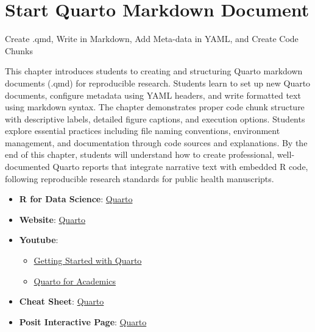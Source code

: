 \documentclass[
  english,
  letterpaper,
  DIV=11,
  numbers=noendperiod]{scrreprt}
\providecommand{\tightlist}{%
  \setlength{\itemsep}{0pt}\setlength{\parskip}{0pt}}
\begin{document}
\chapter{Start Quarto Markdown
Document}\label{start-quarto-markdown-document}

Create .qmd, Write in Markdown, Add Meta-data in YAML, and Create Code
Chunks

This chapter introduces students to creating and structuring Quarto
markdown documents (.qmd) for reproducible research. Students learn to
set up new Quarto documents, configure metadata using YAML headers, and
write formatted text using markdown syntax. The chapter demonstrates
proper code chunk structure with descriptive labels, detailed figure
captions, and execution options. Students explore essential practices
including file naming conventions, environment management, and
documentation through code sources and explanations. By the end of this
chapter, students will understand how to create professional,
well-documented Quarto reports that integrate narrative text with
embedded R code, following reproducible research standards for public
health manuscripts.

\hfill\break

\begin{tcolorbox}[enhanced jigsaw, title=\textcolor{quarto-callout-tip-color}{\faLightbulb}\hspace{0.5em}{📖 Learning Resources}, opacityback=0, colframe=quarto-callout-tip-color-frame, rightrule=.15mm, left=2mm, toprule=.15mm, leftrule=.75mm, titlerule=0mm, bottomtitle=1mm, breakable, arc=.35mm, toptitle=1mm, bottomrule=.15mm, coltitle=black, opacitybacktitle=0.6, colback=white, colbacktitle=quarto-callout-tip-color!10!white]

\begin{itemize}
\tightlist
\item
  \textbf{R for Data Science}:
  \href{https://r4ds.hadley.nz/quarto.html}{Quarto}
\item
  \textbf{Website}: \href{https://quarto.org}{Quarto}
\item
  \textbf{Youtube}:

  \begin{itemize}
  \tightlist
  \item
    \href{https://www.youtube.com/watch?v=_f3latmOhew}{Getting Started
    with Quarto}
  \item
    \href{https://www.youtube.com/watch?v=EbAAmrB0luA}{Quarto for
    Academics}
  \end{itemize}
\item
  \textbf{Cheat Sheet}:
  \href{https://rstudio.github.io/cheatsheets/quarto.pdf}{Quarto}
\item
  \textbf{Posit Interactive Page}:
  \href{https://rstudio.github.io/cheatsheets/html/quarto.html}{Quarto}
\end{itemize}

\end{tcolorbox}
\end{document}
